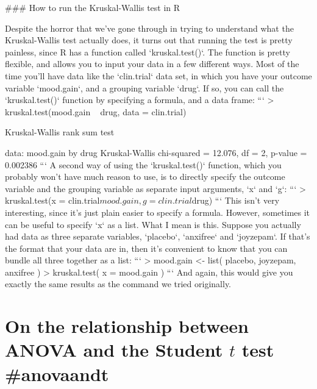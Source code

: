 ### How to run the Kruskal-Wallis test in R

Despite the horror that we've gone through in trying to understand what the Kruskal-Wallis test actually does, it turns out that running the test is pretty painless, since R has a function called `kruskal.test()`. The function is pretty flexible, and allows you to input your data in a few different ways. Most of the time you'll have data like the `clin.trial` data set, in which you have your outcome variable `mood.gain`, and a grouping variable `drug`. If so, you can call the `kruskal.test()` function by specifying a formula, and a data frame:
```
> kruskal.test(mood.gain ~ drug, data = clin.trial)

	Kruskal-Wallis rank sum test

data:  mood.gain by drug 
Kruskal-Wallis chi-squared = 12.076, df = 2, p-value = 0.002386
```
A second way of using the `kruskal.test()` function, which you probably won't have much reason to use, is to directly specify the outcome variable and the grouping variable as separate input arguments, `x` and `g`:
```
> kruskal.test(x = clin.trial$mood.gain, g = clin.trial$drug)
```
This isn't very interesting, since it's just plain easier to specify a formula. However, sometimes it can be useful to specify `x` as a list. What I mean is this. Suppose you actually had data as three separate variables, `placebo`, `anxifree` and `joyzepam`. If that's the format that your data are in, then it's convenient to know that you can bundle all three together as a list:
```
> mood.gain <- list( placebo, joyzepam, anxifree )
> kruskal.test( x = mood.gain )
```
And again, this would give you exactly the same results as the command we tried originally.


\section{On the relationship between ANOVA and the Student $t$ test {#anovaandt}}

